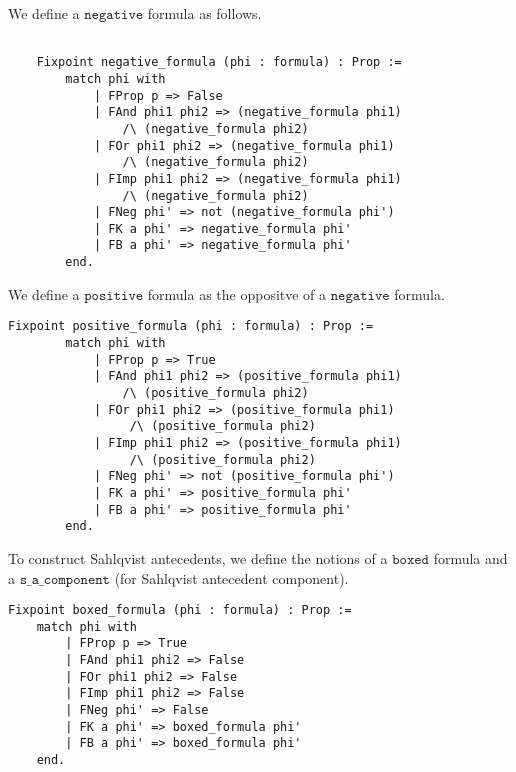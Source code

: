 We define a $\mathtt{negative}$ formula as follows.

\begin{tcolorbox}
	\begin{lstlisting}[language=Coq]
	
	Fixpoint negative_formula (phi : formula) : Prop :=
		match phi with
			| FProp p => False
			| FAnd phi1 phi2 => (negative_formula phi1) 
				/\ (negative_formula phi2)
			| FOr phi1 phi2 => (negative_formula phi1) 
				/\ (negative_formula phi2)
			| FImp phi1 phi2 => (negative_formula phi1) 
				/\ (negative_formula phi2)
			| FNeg phi' => not (negative_formula phi')
			| FK a phi' => negative_formula phi'
			| FB a phi' => negative_formula phi'
		end.
	\end{lstlisting}	
	
\end{tcolorbox}

We define a $\mathtt{positive}$ formula as the oppositve of a $\mathtt{negative}$ formula.

\begin{tcolorbox}
	\begin{lstlisting}[language=Coq]
	Fixpoint positive_formula (phi : formula) : Prop :=
		match phi with
			| FProp p => True
			| FAnd phi1 phi2 => (positive_formula phi1) 
				/\ (positive_formula phi2)
			| FOr phi1 phi2 => (positive_formula phi1)
				 /\ (positive_formula phi2)
			| FImp phi1 phi2 => (positive_formula phi1)
				 /\ (positive_formula phi2)
			| FNeg phi' => not (positive_formula phi')
			| FK a phi' => positive_formula phi'
			| FB a phi' => positive_formula phi'
		end.
	\end{lstlisting}	
	
\end{tcolorbox}

To construct Sahlqvist antecedents, we define the notions of a $\mathtt{boxed}$ formula and a $\mathtt{s\_a\_component}$ (for Sahlqvist antecedent component).

\begin{tcolorbox}
	\begin{lstlisting}[language=Coq]
Fixpoint boxed_formula (phi : formula) : Prop :=
	match phi with
		| FProp p => True
		| FAnd phi1 phi2 => False
		| FOr phi1 phi2 => False
		| FImp phi1 phi2 => False
		| FNeg phi' => False
		| FK a phi' => boxed_formula phi'
		| FB a phi' => boxed_formula phi'
	end.
	\end{lstlisting}	
	
\end{tcolorbox}

